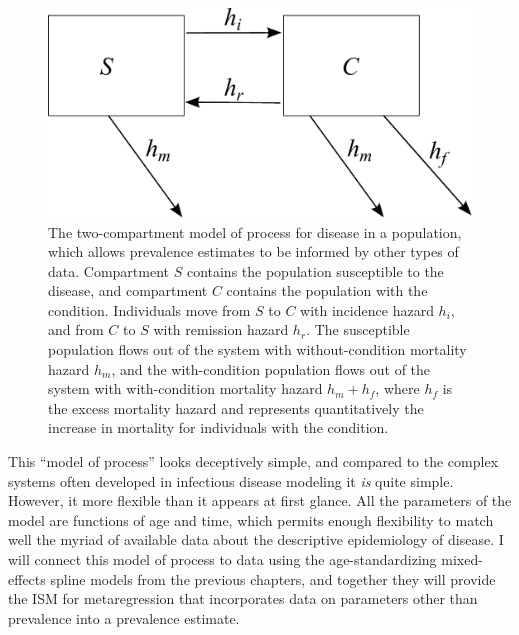 \begin{figure}[h]
\begin{center}
\includegraphics[width=5in]{SC.pdf}
\caption{The two-compartment model of process for disease in a
  population, which allows prevalence estimates to be informed by
  other types of data. Compartment $S$ contains the population
  susceptible to the disease, and compartment $C$ contains the
  population with the condition. Individuals move from $S$ to $C$ with
  incidence hazard $h_i$, and from $C$ to $S$ with remission hazard
  $h_r$. The susceptible population flows out of the system with
  without-condition mortality hazard $h_m$, and the with-condition
  population flows out of the system with with-condition mortality
  hazard $h_m+h_f$, where $h_f$ is the excess mortality hazard and
  represents quantitatively the increase in mortality for
  individuals with the condition.}
\label{forward-sim-two-compartment}
\end{center}
\end{figure}


This ``model of process'' looks deceptively simple, and compared to
the complex systems often developed in infectious disease modeling it
\emph{is} quite simple.  However, it more flexible than it appears at
first glance.  All the parameters of the model are functions of age
and time, which permits enough flexibility to match well the myriad of
available data about the descriptive epidemiology of disease.  I will
connect this model of process to data using the age-standardizing
mixed-effects spline models from the previous chapters, and together
they will provide the ISM for metaregression
that incorporates data on parameters other than prevalence into a
prevalence estimate.

